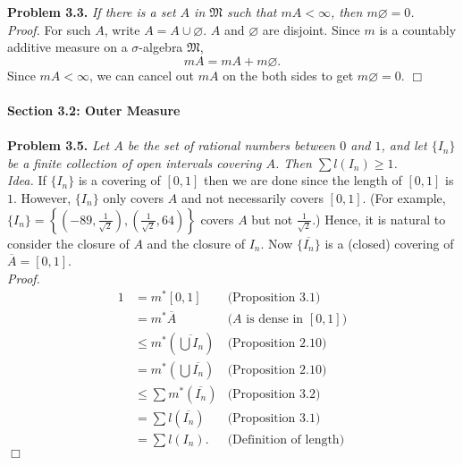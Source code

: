 \documentclass{article}
\begin{document}
\textbf{Problem 3.3.}
\emph{If there is a set $A$ in $\mathfrak{M}$ such that $mA < \infty$,
then $m\varnothing = 0$.} \\

\emph{Proof.}
For such $A$, write $A = A \cup \varnothing$.
$A$ and $\varnothing$ are disjoint.
Since $m$ is a countably additive measure
on a $\sigma$-algebra $\mathfrak{M}$,
$$mA = mA + m\varnothing.$$
Since $mA < \infty$,
we can cancel out $mA$ on the both sides to get
$m\varnothing = 0$.
$\Box$ \\\\






\textbf{\large Section 3.2: Outer Measure} \\\\



\textbf{Problem 3.5.}
\emph{Let $A$ be the set of rational numbers between $0$ and $1$, and
let $\{ I_n\}$ be a finite collection of open intervals covering $A$.
Then $\sum l(I_n) \geq 1$.} \\

\emph{Idea.}
If $\{ I_n\}$ is a covering of $[0, 1]$ then we are done
since the length of $[0, 1]$ is $1$.
However, $\{ I_n\}$ only covers $A$ and not necessarily covers $[0, 1]$.
(For example,
$\{ I_n\}
= \left\{
\left( -89, \frac{1}{\sqrt{2}} \right),
\left( \frac{1}{\sqrt{2}}, 64 \right)
\right\}$ covers $A$ but not $\frac{1}{\sqrt{2}}$.)
Hence, it is natural to consider the closure of $A$ and
the closure of $I_n$.
Now $\{ \overline{I_n} \}$ is a (closed) covering of
$\overline{A} = [0, 1]$. \\

\emph{Proof.}
\begin{align*}
1
&= m^{*}[0, 1]
  &\text{(Proposition 3.1)} \\
&= m^{*}\overline{A}
  &\text{($A$ is dense in $[0, 1]$)} \\
&\leq m^{*}\left( \overline{\bigcup I_n} \right)
  &\text{(Proposition 2.10)} \\
&= m^{*}\left( \bigcup \overline{I_n} \right)
  &\text{(Proposition 2.10)} \\
&\leq \sum m^{*}(\overline{I_n})
  &\text{(Proposition 3.2)} \\
&= \sum l(\overline{I_n})
  &\text{(Proposition 3.1)} \\
&= \sum l(I_n).
  &\text{(Definition of length)}
\end{align*}
$\Box$ \\
\end{document}
